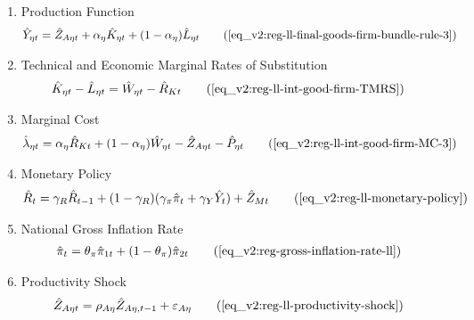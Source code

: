 \documentclass[../thesis.tex]{subfiles}
\begin{document}
{\begin{itemize}
\begin{enumerate}
\begin{comment}
				\item Euler equation for regional consumption
				\begin{align}
					\hat{C}_{1, t+1} - \hat{C}_{1t} = \hat{C}_{2, t+1} - \hat{C}_{2t} \tag{\ref{eq_v2:reg-bonds-euler-equation-2-ll}}
				\end{align}
			\end{comment}
			
			\item Production Function
			\begin{align}
				\hat{Y}_{\eta t} &= \hat{Z}_{A\eta t} + {\alpha_{\eta}} \hat{K}_{\eta t} + (1-\alpha_{\eta}) \hat{L}_{\eta t} \tag{\ref{eq_v2:reg-ll-final-goods-firm-bundle-rule-3}}
			\end{align}
			
			\item Technical and Economic Marginal Rates of Substitution %
			\begin{align}
				\hat{K}_{\eta t} - \hat{L}_{\eta t} &= \hat{W}_{\eta t} - \hat{R}_{K t} \tag{\ref{eq_v2:reg-ll-int-good-firm-TMRS}}
			\end{align}
			
			\item Marginal Cost
			\begin{align}
				\hat{\lambda}_{\eta t} &= {\alpha_{\eta}} \hat{R}_{Kt} + (1- {\alpha_{\eta}}) \hat{W}_{\eta t} - \hat{Z}_{A\eta t} - \hat{P}_{\eta t} \tag{\ref{eq_v2:reg-ll-int-good-firm-MC-3}}
			\end{align}
			
			\item Monetary Policy
			\begin{align}
				\hat{R}_t = \gamma_{R} \hat{R}_{t-1} + (1-\gamma_{R})(\gamma_{\pi} \hat{\pi}_t + \gamma_{Y} \hat{Y}_t) + \hat{Z}_{Mt} \tag{\ref{eq_v2:reg-ll-monetary-policy}}
			\end{align}
			
			\item National Gross Inflation Rate
			\begin{align}
				\hat{\pi}_{t} &= \theta_{\pi} \hat{\pi}_{1t} + (1 - \theta_{\pi}) \hat{\pi}_{2t} \tag{\ref{eq_v2:reg-gross-inflation-rate-ll}}
			\end{align}
			
			\item Productivity Shock
			\begin{alignat}{2}
				\hat{Z}_{A\eta t} &= \rho_{A\eta} \hat{Z}_{A\eta, t-1} + \varepsilon_{A\eta} \tag{\ref{eq_v2:reg-ll-productivity-shock}}
			\end{alignat}
			

\end{enumerate}
\end{itemize}}
\end{document}
